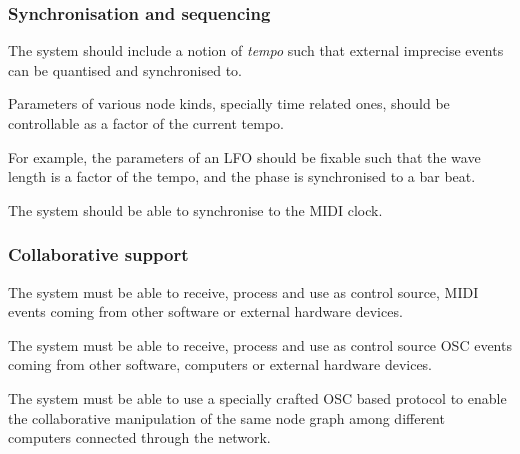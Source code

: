 \subsubsection{Synchronisation and sequencing}

\begin{requirement}
  \label{req:iter4-begin}
  The system should include a notion of \emph{tempo} such
  that external imprecise events can be quantised and synchronised to.
\end{requirement}

\begin{requirement}
  Parameters of various node kinds, specially time
  related ones, should be controllable as a factor of the current
  tempo.
\end{requirement}

For example, the parameters of an LFO should be fixable such that the
wave length is a factor of the tempo, and the phase is synchronised to
a bar beat.

\begin{requirement}
  The system should be able to synchronise to the MIDI
  clock.
\end{requirement}

\subsubsection{Collaborative support}

\begin{requirement}
  The system must be able to receive, process and use as control
  source, MIDI events coming from other software or external hardware
  devices.
\end{requirement}

\begin{requirement}
  The system must be able to receive, process and use as control
  source OSC events coming from other software, computers or external
  hardware devices.
\end{requirement}

\begin{requirement}
  \label{req:iter4-end}
  \label{req:sharedenv}
  The system must be able to use a specially crafted OSC based
  protocol to enable the collaborative manipulation of the same node
  graph among different computers connected through the network.
\end{requirement}

